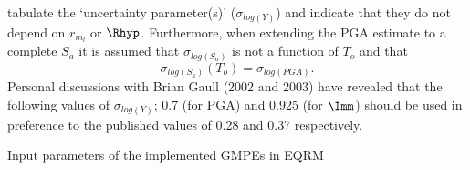 \citet[Table 4]{eqrm_Gaull90a} tabulate the `uncertainty
parameter(s)' ($\sigma_{log(Y)}$) and indicate that they do not
depend on $r_{m_l}$ or $\Rhyp$. Furthermore, when extending the PGA
estimate to a complete $S_a$ it is assumed that $\sigma_{log(S_a)}$
is not a function of $T_o$ and that
\begin{equation}
\sigma_{log(S_a)}(T_o) = \sigma_{log(PGA)}.
\end{equation}
Personal discussions with Brian Gaull (2002 and 2003) have revealed
that the following values of $\sigma_{log(Y)}$; 0.7 (for PGA) and
0.925 (for $\Imm$) should be used in preference to the published
values of 0.28 and 0.37 respectively.
\begin{landscape}
\begin{table}[!t]
\renewcommand{\arraystretch}{1.3}
\caption{Input parameters of the implemented GMPEs in EQRM}
\label{inputs} \centering


\end{table}
\end{landscape}
